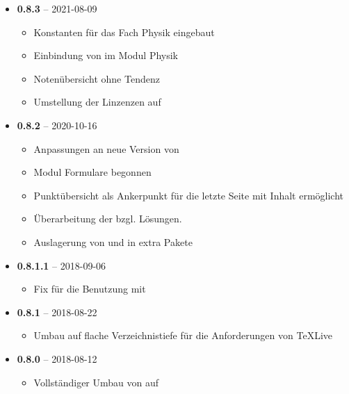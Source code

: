 \begin{itemize}
\begin{itemize}
        \item Modul Aufgabenpool hinzugefügt
        \item Option: Einbindung von hyperxmp kann bei Lizenzen unterbunden werden
        \item Konstanten für das Fach Physik ergänzt
        \item Abhängigkeit von mdframe entfernt
    \end{itemize}
    \item \textbf{0.8.3} -- 2021-08-09
      \begin{itemize}
       \item Konstanten für das Fach Physik eingebaut
       \item Einbindung von  im Modul Physik
       \item Notenübersicht ohne Tendenz
       \item Umstellung der Linzenzen auf 
      \end{itemize}
    \item \textbf{0.8.2} -- 2020-10-16
      \begin{itemize}
        \item Anpassungen an neue Version von 
        \item Modul Formulare begonnen
        \item Punktübersicht als Ankerpunkt für die letzte Seite mit Inhalt ermöglicht
        \item Überarbeitung der  bzgl. Lösungen.
        \item Auslagerung von  und  in extra Pakete
      \end{itemize}
  \item \textbf{0.8.1.1} -- 2018-09-06
      \begin{itemize}
        \item Fix für die Benutzung mit 
      \end{itemize}
  \item \textbf{0.8.1} -- 2018-08-22
      \begin{itemize}
        \item Umbau auf flache Verzeichnistiefe für die Anforderungen von TeXLive
      \end{itemize}
  \item \textbf{0.8.0} -- 2018-08-12
      \begin{itemize}
        \item Vollständiger Umbau von  auf 

\end{itemize}
\end{itemize}
